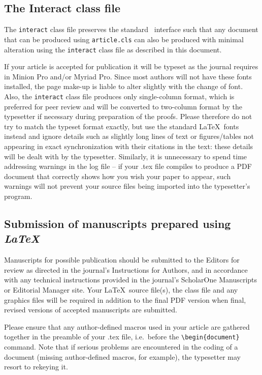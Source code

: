 \documentclass[]{interact}
\theoremstyle{plain}%
\theoremstyle{definition}
\theoremstyle{remark}
\begin{document}
\subsection{The \textsf{Interact} class file}\label{class}

The \texttt{interact} class file preserves the standard \LaTeXe\ interface such that any document that can be produced using \texttt{article.cls} can also be produced with minimal alteration using the \texttt{interact} class file as described in this document.

If your article is accepted for publication it will be typeset as the journal requires in Minion Pro and/or Myriad Pro. Since most authors will not have these fonts installed, the page make-up is liable to alter slightly with the change of font. Also, the \texttt{interact} class file produces only single-column format, which is preferred for peer review and will be converted to two-column format by the typesetter if necessary during preparation of the proofs. Please therefore do not try to match the typeset format exactly, but use the standard \LaTeX\ fonts instead and ignore details such as slightly long lines of text or figures/tables not appearing in exact synchronization with their citations in the text: these details will be dealt with by the typesetter. Similarly, it is unnecessary to spend time addressing warnings in the log file -- if your .tex file compiles to produce a PDF document that correctly shows how you wish your paper to appear, such warnings will not prevent your source files being imported into the typesetter's program.


\subsection{Submission of manuscripts prepared using \emph{\LaTeX}}

Manuscripts for possible publication should be submitted to the Editors for review as directed in the journal's Instructions for Authors, and in accordance with any technical instructions provided in the journal's ScholarOne Manuscripts or Editorial Manager site. Your \LaTeX\ source file(s), the class file and any graphics files will be required in addition to the final PDF version when final, revised versions of accepted manuscripts are submitted.

Please ensure that any author-defined macros used in your article are gathered together in the preamble of your .tex file, i.e.\ before the \verb"\begin{document}" command. Note that if serious problems are encountered in the coding of a document (missing author-defined macros, for example), the typesetter may resort to rekeying it.
\end{document}
